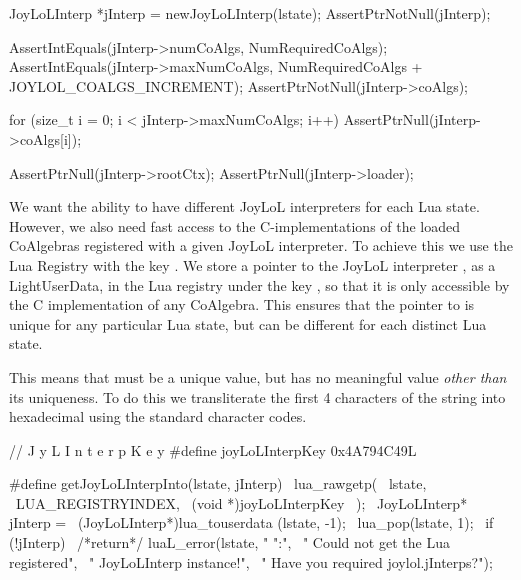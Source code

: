 
\startCTest
  JoyLoLInterp *jInterp = newJoyLoLInterp(lstate);
  AssertPtrNotNull(jInterp);
  
  AssertIntEquals(jInterp->numCoAlgs,
    NumRequiredCoAlgs);
  AssertIntEquals(jInterp->maxNumCoAlgs,
    NumRequiredCoAlgs + JOYLOL_COALGS_INCREMENT);
  AssertPtrNotNull(jInterp->coAlgs);
  
  for (size_t i = 0; i < jInterp->maxNumCoAlgs; i++) {
    AssertPtrNull(jInterp->coAlgs[i]);
  }
  
  AssertPtrNull(jInterp->rootCtx);
  AssertPtrNull(jInterp->loader);
\stopCTest
\stopTestCase
\stopTestSuite


We want the ability to have different JoyLoL interpreters for each Lua 
state. However, we also need fast access to the C-implementations of the 
loaded CoAlgebras registered with a given JoyLoL interpreter. To achieve 
this we use the Lua Registry with the  key 
. We store a pointer to the JoyLoL interpreter 
, as a LightUserData, in the Lua registry under the key 
, so that it is only accessible by the C 
implementation of any CoAlgebra. This ensures that the pointer to 
 is unique for any particular Lua state, but can be 
different for each distinct Lua state. 

This means that  must be a unique value, but has no 
meaningful value \emph{other than} its uniqueness. To do this we 
transliterate the first 4 characters of the string  
into hexadecimal using the standard  character codes. 

\startCHeader
//                         J y L I n t e r p K e y
#define joyLoLInterpKey 0x4A794C49L

#define getJoyLoLInterpInto(lstate, jInterp)      \
  lua_rawgetp(                                    \
    lstate,                                       \
    LUA_REGISTRYINDEX,                            \
    (void *)joyLoLInterpKey                       \
  );                                              \
  JoyLoLInterp* jInterp =                         \
    (JoyLoLInterp*)lua_touserdata (lstate, -1);   \
  lua_pop(lstate, 1);                             \
  if (!jInterp) {                                 \
    /*return*/ luaL_error(lstate, "%
      "\nERROR:\n",                               \
      "  Could not get the Lua registered\n",     \
      "  JoyLoLInterp instance!\n",               \
      "  Have you required joylol.jInterps?\n");  \
  }
\stopCHeader

